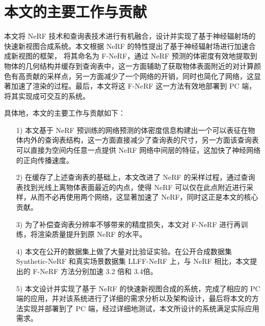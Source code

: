 \section{本文的主要工作与贡献}

本文将 NeRF 技术和查询表技术进行有机融合，设计并实现了基于神经辐射场的快速新视图合成系统。本文根据 NeRF 的特性提出了基于神经辐射场进行加速合成新视图的框架， 将其命名为 F-NeRF，通过 NeRF 预测的体密度有效地提取到物体的几何结构并缓存到查询表中，这一方面辅助了获取物体表面附近的对计算颜色有高贡献的采样点，另一方面减少了一个网络的开销，同时也简化了网络，这显著加速了渲染的过程。最后，本文将这 F-NeRF 这一方法有效地部署到 PC 端，将其实现成可交互的系统。

具体地，本文的主要工作与贡献如下：
\begin{enumerate}
    \item [1)] 本文基于 NeRF 预训练的网络预测的体密度信息构建出一个可以表征在物体内外的查询表结构，这一方面直接减少了查询表的尺寸，另一方面该查询表可以直接为空间内任意一点提供 NeRF 网络中间层的特征，这加快了神经网络的正向传播速度。
    \item [2)] 在缓存了上述查询表的基础上，本文改进了 NeRF 的采样过程，通过查询表找到光线上离物体表面最近的内点，使得 NeRF 可以仅在此点附近进行采样，从而不必再使用两个网络，这显著加速了 NeRF，同时这正是本文的核心贡献。
    \item [3)] 为了补偿查询表分辨率不够带来的精度损失，本文对 F-NeRF 进行再训练，将渲染质量提升到原 NeRF 的水平。
    \item [4)] 本文在公开的数据集上做了大量对比验证实验。在公开合成数据集 Synthetic-NeRF 和真实场景数据集 LLFF-NeRF 上，与 NeRF 相比，本文提出的 F-NeRF 方法分别加速 3.2 倍和 3.4倍。 
    \item [5)] 本文设计并实现了基于 NeRF 的快速新视图合成的系统，完成了相应的 PC 端的应用，并对该系统进行了详细的需求分析以及架构设计，最后将本文的方法实现并部署到了 PC 端，经过详细地测试，本文所设计的系统满足实际应用需求。
\end{enumerate}



